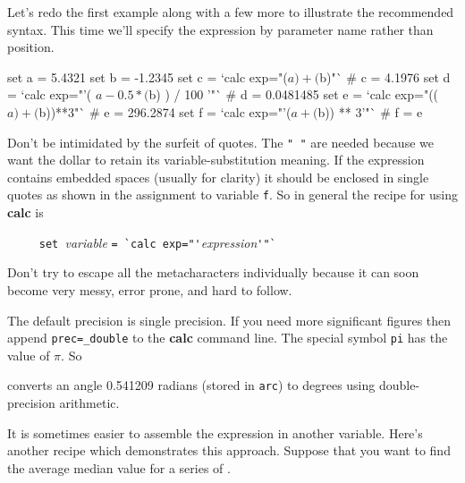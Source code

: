\documentclass[twoside,11pt,nolof]{starlink}
\providecommand{\NDFrefa}[1]{\xref{#1}{sun33}{}}
\begin{document}
Let's redo the first example along with a few more to illustrate the
recommended syntax.  This time we'll specify the expression by parameter
name rather than position.

\begin{small}
\begin{terminalv}
     set a = 5.4321
     set b = -1.2345
     set c = `calc exp="($a)+($b)"`                     # c = 4.1976
     set d = `calc exp="'( $a - 0.5 * ($b) ) / 100 '"`  # d = 0.0481485
     set e = `calc exp="(($a)+($b))**3"`                # e = 296.2874
     set f = `calc exp="'($a + ($b)) ** 3'"`            # f = e
\end{terminalv}
\end{small}
Don't be intimidated by the surfeit of quotes.  The \texttt{"~"} are needed
because we want the dollar to retain its variable-substitution meaning.
If the expression contains embedded spaces (usually for clarity) it
should be enclosed in single quotes as shown in the assignment to
variable \texttt{f}.  So in general the recipe for using \textbf{calc} is

\verb#     set #\emph{variable} \verb#= `calc exp="'#\emph{expression}\verb#'"`#

Don't try to escape all the metacharacters individually because it can
soon become very messy, error prone, and hard to follow.
\medskip

The default precision is single precision.  If you need more
significant figures then append \texttt{prec=\_double} to the \textbf{calc}
command line.  The special symbol \texttt{pi} has the value of $\pi$.  So

\begin{small}
\end{small}
converts an angle 0.541209 radians (stored in \texttt{arc}) to degrees
using double-precision arithmetic.

It is sometimes easier to assemble the expression in another variable.
Here's another recipe which demonstrates this approach.  Suppose that you
want to find the average median value for a series of \NDFrefa{\textsf{NDF}s}.
\end{document}
